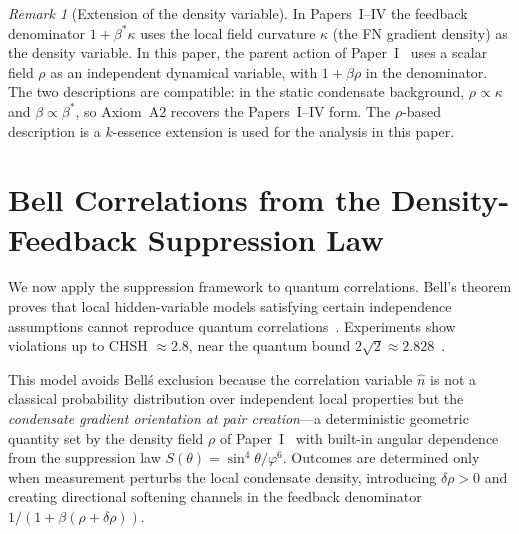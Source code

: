 \documentclass[11pt,a4paper]{article}
\theoremstyle{definition}
\theoremstyle{remark}
\newtheorem{remark}[theorem]{Remark}
\newcommand{\vp}{\varphi}
\newcommand{\bst}{\beta^{*}}
\begin{document}
\begin{remark}[Extension of the density variable]
\label{P8:rem:rho_extension}
In Papers~I--IV the feedback denominator $1+\bst\kappa$ uses the local
field curvature $\kappa$ (the FN gradient density) as the density variable.
In this paper, the parent action of Paper~I~\cite{Paper1} uses a scalar
field $\rho$ as an independent dynamical variable, with $1+\beta\rho$ in
the denominator.  The two descriptions are compatible: in the static
condensate background, $\rho\propto\kappa$ and $\beta\propto\bst$, so
Axiom~A2 recovers the Papers~I--IV form.  The $\rho$-based description
is a $k$-essence extension is used for the analysis in this paper.  
\end{remark}

\section{Bell Correlations from the Density-Feedback Suppression Law}
\label{P8:sec:bell_correlations}

We now apply the suppression framework to quantum correlations. Bell's theorem proves that local hidden-variable models satisfying certain independence assumptions cannot reproduce quantum correlations~\cite{Bell1964}. Experiments show violations up to CHSH $\approx 2.8$, near the quantum bound $2\sqrt{2} \approx 2.828$~\cite{Tsirelson1980,Hensen2015}.

This model avoids Bell\'s exclusion because the correlation variable $\hat{n}$ is not a classical probability distribution over independent local properties but the \emph{condensate gradient orientation at pair creation}---a deterministic geometric quantity set by the density field $\rho$ of Paper~I~\cite{Paper1} with built-in angular dependence from the suppression law $S(\theta)=\sin^4\!\theta/\vp^6$. Outcomes are determined only when measurement perturbs the local condensate density, introducing $\delta\rho > 0$ and creating directional softening channels in the feedback denominator $1/(1+\beta(\rho+\delta\rho))$.
\end{document}
